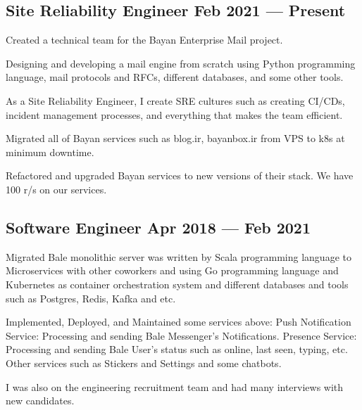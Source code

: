 \subsection{{Site Reliability Engineer  \hfill Feb 2021 --- Present}}
\begin{zitemize}
\item Created a technical team for the Bayan Enterprise Mail project.
\item Designing and developing a mail engine from scratch using Python programming language, mail protocols and RFCs, different databases, and some other tools.
\item As a Site Reliability Engineer, I create SRE cultures such as creating CI/CDs, incident management processes, and everything that makes the team efficient.
\item Migrated all of Bayan services such as blog.ir, bayanbox.ir from VPS to k8s at minimum downtime.
\item Refactored and upgraded Bayan services to new versions of their stack.
We have 100 r/s on our services.
\end{zitemize}


\subsection{{Software Engineer  \hfill Apr 2018 --- Feb 2021}}

\begin{zitemize}
\item Migrated Bale monolithic server was written by Scala programming language to Microservices with other coworkers and using Go programming language and Kubernetes as container orchestration system and different databases and tools such as Postgres, Redis, Kafka and etc.
\item Implemented, Deployed, and Maintained some services above:
\newline
 Push Notification Service: Processing and sending Bale Messenger's Notifications.
 \newline
 Presence Service: Processing and sending Bale User's status such as online, last seen, typing, etc.
 \newline
 Other services such as Stickers and Settings and some chatbots.
 \item I was also on the engineering recruitment team and had many interviews with new candidates.
\end{zitemize}

